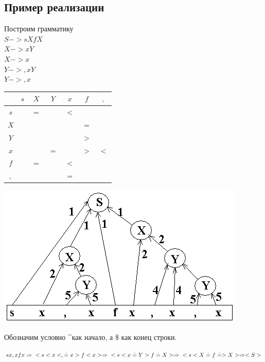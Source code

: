 \documentclass[a4paper,12pt]{article}
\begin{document}
\subsection{Пример реализации}
Построим грамматику \\
$S -> sXfX$\\
$X -> xY$\\
$X -> x$\\
$Y -> ,xY$\\
$Y -> ,x$\\

\begin{tabular}[l]{c|cccccc}
    & $s$ & $X$ & $Y$ & $x$ & $f$ & $,$ \\
\hline
$s$ &     & $=$ &     & $<$ &     &     \\
$X$ &     &     &     &     & $=$ &     \\
$Y$ &     &     &     &     & $>$ &     \\
$x$ &     &     & $=$ &     & $>$ & $<$ \\
$f$ &     & $=$ &     & $<$ &     &     \\
$,$ &     &     &     & $=$ &     &     \\
\end{tabular}

\includegraphics[scale=1.0]{lab4/lab4.png}\vspace{1em}

Обозначим условно \textasciicircum как начало, а \$ как конец строки.

\begin{math}
sx,xfx => \\
<s<x<, \doteq x>f<x> => \\
<s<x \doteq Y>f \doteq X> => \\
<s<X \doteq f \doteq >X> => <S>
\end{math}\\
\end{document}
